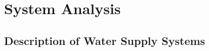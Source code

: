
\part{System Analysis}
\label{system_analysis}

\chapter{Description of Water Supply Systems}
\label{description_of_water_supply_systems}

 

 
























